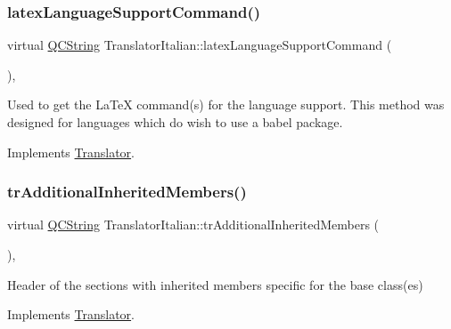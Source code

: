 \mbox{\label{class_translator_italian_a627c83ff76fb011b240d99de017dd2c7}} 
\subsubsection{\texorpdfstring{latexLanguageSupportCommand()}{latexLanguageSupportCommand()}}
{\footnotesize\ttfamily virtual \mbox{\hyperlink{class_q_c_string}{Q\+C\+String}} Translator\+Italian\+::latex\+Language\+Support\+Command (\begin{DoxyParamCaption}{ }\end{DoxyParamCaption})\hspace{0.3cm}{\ttfamily [inline]}, {\ttfamily [virtual]}}

Used to get the La\+TeX command(s) for the language support. This method was designed for languages which do wish to use a babel package. 

Implements \mbox{\hyperlink{class_translator}{Translator}}.

\mbox{\label{class_translator_italian_a82f2eeea8a3292c31ed0c3fa6fea4f3c}} 
\subsubsection{\texorpdfstring{trAdditionalInheritedMembers()}{trAdditionalInheritedMembers()}}
{\footnotesize\ttfamily virtual \mbox{\hyperlink{class_q_c_string}{Q\+C\+String}} Translator\+Italian\+::tr\+Additional\+Inherited\+Members (\begin{DoxyParamCaption}{ }\end{DoxyParamCaption})\hspace{0.3cm}{\ttfamily [inline]}, {\ttfamily [virtual]}}

Header of the sections with inherited members specific for the base class(es) 

Implements \mbox{\hyperlink{class_translator}{Translator}}.

\mbox{\label{class_translator_italian_a2042276baccefc301d0f372baa2789d6}} 
